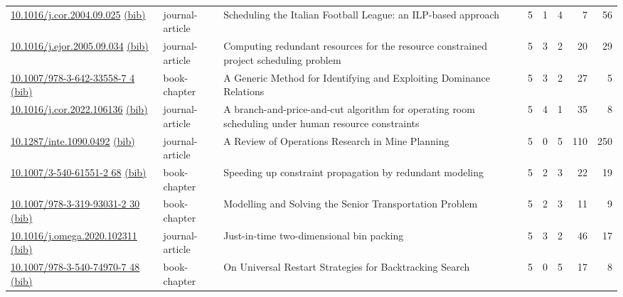 {\begin{longtable}{p{5cm}lp{11cm}rrrrr}
\href{http://dx.doi.org/10.1016/j.cor.2004.09.025}{10.1016/j.cor.2004.09.025} \href{https://www.doi2bib.org/bib/10.1016/j.cor.2004.09.025}{(bib)} & journal-article & Scheduling the Italian Football League: an ILP-based approach & 5 & 1 & 4 & 7 & 56 \\
\href{http://dx.doi.org/10.1016/j.ejor.2005.09.034}{10.1016/j.ejor.2005.09.034} \href{https://www.doi2bib.org/bib/10.1016/j.ejor.2005.09.034}{(bib)} & journal-article & Computing redundant resources for the resource constrained project scheduling problem & 5 & 3 & 2 & 20 & 29 \\
\href{http://dx.doi.org/10.1007/978-3-642-33558-7_4}{10.1007/978-3-642-33558-7 4} \href{https://www.doi2bib.org/bib/10.1007/978-3-642-33558-7_4}{(bib)} & book-chapter & A Generic Method for Identifying and Exploiting Dominance Relations & 5 & 3 & 2 & 27 & 5 \\
\href{http://dx.doi.org/10.1016/j.cor.2022.106136}{10.1016/j.cor.2022.106136} \href{https://www.doi2bib.org/bib/10.1016/j.cor.2022.106136}{(bib)} & journal-article & A branch-and-price-and-cut algorithm for operating room scheduling under human resource constraints & 5 & 4 & 1 & 35 & 8 \\
\href{http://dx.doi.org/10.1287/inte.1090.0492}{10.1287/inte.1090.0492} \href{https://www.doi2bib.org/bib/10.1287/inte.1090.0492}{(bib)} & journal-article & A Review of Operations Research in Mine Planning & 5 & 0 & 5 & 110 & 250 \\
\href{http://dx.doi.org/10.1007/3-540-61551-2_68}{10.1007/3-540-61551-2 68} \href{https://www.doi2bib.org/bib/10.1007/3-540-61551-2_68}{(bib)} & book-chapter & Speeding up constraint propagation by redundant modeling & 5 & 2 & 3 & 22 & 19 \\
\href{http://dx.doi.org/10.1007/978-3-319-93031-2_30}{10.1007/978-3-319-93031-2 30} \href{https://www.doi2bib.org/bib/10.1007/978-3-319-93031-2_30}{(bib)} & book-chapter & Modelling and Solving the Senior Transportation Problem & 5 & 2 & 3 & 11 & 9 \\
\href{http://dx.doi.org/10.1016/j.omega.2020.102311}{10.1016/j.omega.2020.102311} \href{https://www.doi2bib.org/bib/10.1016/j.omega.2020.102311}{(bib)} & journal-article & Just-in-time two-dimensional bin packing & 5 & 3 & 2 & 46 & 17 \\
\href{http://dx.doi.org/10.1007/978-3-540-74970-7_48}{10.1007/978-3-540-74970-7 48} \href{https://www.doi2bib.org/bib/10.1007/978-3-540-74970-7_48}{(bib)} & book-chapter & On Universal Restart Strategies for Backtracking Search & 5 & 0 & 5 & 17 & 8 \\

\end{longtable}}
